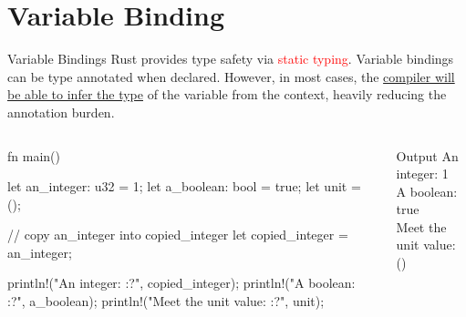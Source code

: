 \documentclass[10pt,xcolor={dvipsnames}, aspectratio=169]{beamer}
\begin{document}
\section{Variable Binding}
\begin{frame}[fragile]{Variable Bindings}
	Rust provides type safety via \textcolor{red}{static typing}. Variable bindings can be type annotated when declared. However, in most cases, the \underline{compiler will be able to infer the type} of the variable from the context, heavily reducing the annotation burden.
	\begin{columns}[T]
		\begin{column}{0.6 \textwidth}
            \begin{rustcode}
   fn main() {
        let an_integer: u32 = 1;
        let a_boolean: bool = true;
        let unit = ();
    
        // copy an_integer into copied_integer
        let copied_integer = an_integer;
    
        println!("An integer: {:?}", copied_integer);
        println!("A boolean: {:?}", a_boolean);
        println!("Meet the unit value: {:?}", unit);
    }
            \end{rustcode}
		\end{column}
		\begin{column}{0.4 \textwidth}
			\begin{block}{Output}
				An integer: 1 \\
				A boolean: true \\
				Meet the unit value: ()
			\end{block}
		\end{column}
	\end{columns}
\end{frame}
\end{document}
